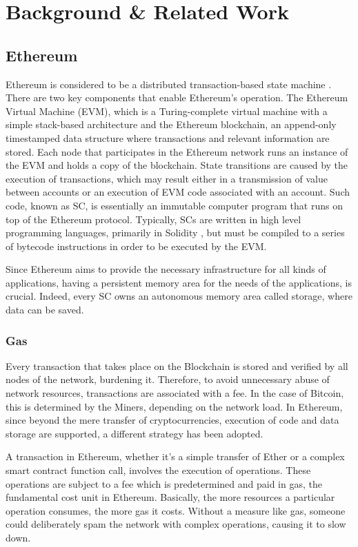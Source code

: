\chapter{Background \& Related Work}\label{chapter:background}

\section{Ethereum}\label{sec:ethereum}
Ethereum is considered to be a distributed transaction-based state machine  \citep{wood_2014}. There are two key components that enable Ethereum’s operation. The Ethereum Virtual Machine (EVM), which is a Turing-complete virtual machine with a simple stack-based architecture and the Ethereum blockchain, an append-only timestamped data structure where transactions and relevant information are stored. Each node that participates in the Ethereum network runs an instance of the EVM and holds a copy of the blockchain. State transitions are caused by the execution of transactions, which may result either in a transmission of value between accounts or an execution of EVM code associated with an account. Such code, known as SC, is essentially an immutable computer program that runs on top of the Ethereum protocol. Typically, SCs are written in high level programming languages, primarily in Solidity  \citep{solidity}, but must be compiled to a series of bytecode instructions in order to be executed by the EVM.

Since Ethereum aims to provide the necessary infrastructure for all kinds of applications, having a persistent memory area for the needs of the applications, is crucial. Indeed, every SC owns an autonomous memory area called storage, where data can be saved.

\subsection{Gas}\label{sec:gas}
Every transaction that takes place on the Blockchain is stored and verified by all nodes of the network, burdening it. Therefore, to avoid unnecessary abuse of network resources, transactions are associated with a fee. In the case of Bitcoin, this is determined by the Miners, depending on the network load. In Ethereum, since beyond the mere transfer of cryptocurrencies, execution of code and data storage are supported, a different strategy has been adopted.

A transaction in Ethereum, whether it's a simple transfer of Ether or a complex smart contract function call, involves the execution of operations. These operations are subject to a fee which is predetermined  \citep{wood_2014} and paid in gas, the fundamental cost unit in Ethereum. Basically, the more resources a particular operation consumes, the more gas it costs. Without a measure like gas, someone could deliberately spam the network with complex operations, causing it to slow down.

